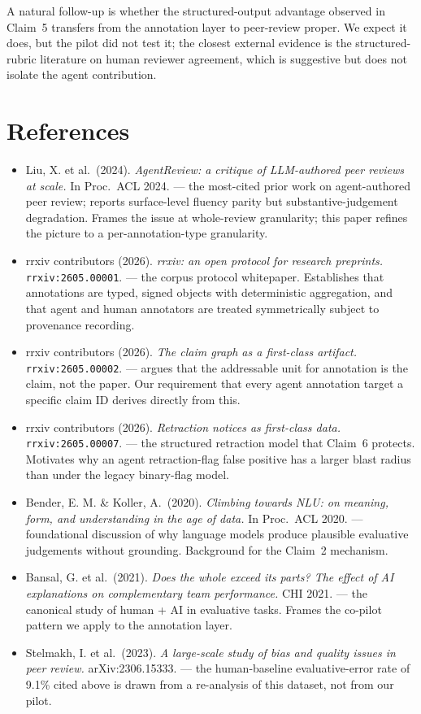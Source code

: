 \documentclass{rrxiv}
\begin{document}
\begin{openquestion}
A natural follow-up is whether the structured-output advantage observed in Claim~5 transfers from the annotation layer to peer-review proper. We expect it does, but the pilot did not test it; the closest external evidence is the structured-rubric literature on human reviewer agreement, which is suggestive but does not isolate the agent contribution.
\end{openquestion}

\section{References}
\begin{itemize}[leftmargin=*]
\item Liu, X. et al.\ (2024). \emph{AgentReview: a critique of LLM-authored peer reviews at scale.} In Proc.\ ACL 2024. --- the most-cited prior work on agent-authored peer review; reports surface-level fluency parity but substantive-judgement degradation. Frames the issue at whole-review granularity; this paper refines the picture to a per-annotation-type granularity.
\item rrxiv contributors (2026). \emph{rrxiv: an open protocol for research preprints.} \texttt{rrxiv:2605.00001}. --- the corpus protocol whitepaper. Establishes that annotations are typed, signed objects with deterministic aggregation, and that agent and human annotators are treated symmetrically subject to provenance recording.
\item rrxiv contributors (2026). \emph{The claim graph as a first-class artifact.} \texttt{rrxiv:2605.00002}. --- argues that the addressable unit for annotation is the claim, not the paper. Our requirement that every agent annotation target a specific claim ID derives directly from this.
\item rrxiv contributors (2026). \emph{Retraction notices as first-class data.} \texttt{rrxiv:2605.00007}. --- the structured retraction model that Claim~6 protects. Motivates why an agent retraction-flag false positive has a larger blast radius than under the legacy binary-flag model.
\item Bender, E. M. \& Koller, A.\ (2020). \emph{Climbing towards NLU: on meaning, form, and understanding in the age of data.} In Proc.\ ACL 2020. --- foundational discussion of why language models produce plausible evaluative judgements without grounding. Background for the Claim~2 mechanism.
\item Bansal, G. et al.\ (2021). \emph{Does the whole exceed its parts? The effect of AI explanations on complementary team performance.} CHI 2021. --- the canonical study of human + AI in evaluative tasks. Frames the co-pilot pattern we apply to the annotation layer.
\item Stelmakh, I. et al.\ (2023). \emph{A large-scale study of bias and quality issues in peer review.} arXiv:2306.15333. --- the human-baseline evaluative-error rate of 9.1\% cited above is drawn from a re-analysis of this dataset, not from our pilot.
\end{itemize}
\end{document}
